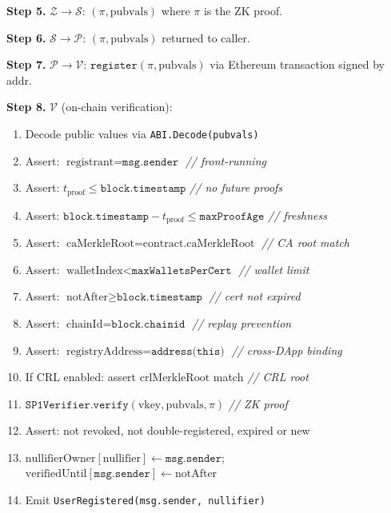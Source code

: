 \documentclass[11pt, a4paper]{article}
\begin{document}
\begin{mdframed}[linewidth=0.5pt, innertopmargin=8pt, innerbottommargin=8pt]
\medskip
\textbf{Step 5.} $\mathcal{Z} \rightarrow \mathcal{S}$:
$(\pi, \text{pubvals})$ where $\pi$ is the ZK proof.

\medskip
\textbf{Step 6.} $\mathcal{S} \rightarrow \mathcal{P}$:
$(\pi, \text{pubvals})$ returned to caller.

\medskip
\textbf{Step 7.} $\mathcal{P} \rightarrow \mathcal{V}$:
$\texttt{register}(\pi, \text{pubvals})$ via Ethereum transaction signed by addr.

\medskip
\textbf{Step 8.} $\mathcal{V}$ (on-chain verification):
\begin{enumerate}[nosep,leftmargin=1.5em]
\item Decode public values via \texttt{ABI.Decode(pubvals)}
\item Assert: $\text{registrant} = \texttt{msg.sender}$ \hfill\textit{// front-running}
\item Assert: $t_{\text{proof}} \leq \texttt{block.timestamp}$ \hfill\textit{// no future proofs}
\item Assert: $\texttt{block.timestamp} - t_{\text{proof}} \leq \texttt{maxProofAge}$ \hfill\textit{// freshness}
\item Assert: $\text{caMerkleRoot} = \text{contract.caMerkleRoot}$ \hfill\textit{// CA root match}
\item Assert: $\text{walletIndex} < \texttt{maxWalletsPerCert}$ \hfill\textit{// wallet limit}
\item Assert: $\text{notAfter} \geq \texttt{block.timestamp}$ \hfill\textit{// cert not expired}
\item Assert: $\text{chainId} = \texttt{block.chainid}$ \hfill\textit{// replay prevention}
\item Assert: $\text{registryAddress} = \texttt{address(this)}$ \hfill\textit{// cross-DApp binding}
\item If CRL enabled: assert $\text{crlMerkleRoot}$ match \hfill\textit{// CRL root}
\item $\texttt{SP1Verifier.verify}(\text{vkey}, \text{pubvals}, \pi)$ \hfill\textit{// ZK proof}
\item Assert: not revoked, not double-registered, expired or new
\item $\text{nullifierOwner}[\text{nullifier}] \leftarrow \texttt{msg.sender}$;
  $\text{verifiedUntil}[\texttt{msg.sender}] \leftarrow \text{notAfter}$
\item Emit \texttt{UserRegistered(msg.sender, nullifier)}
\end{enumerate}
\end{mdframed}
\end{document}
